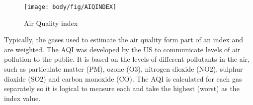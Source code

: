 \begin{figure}[!htb]
	\centering
	\texttt{[image: body/fig/AIQINDEX]}
	\caption{Air Quality index \cite{GreenEcon2}}
	\label{fig:index}
\end{figure}

\noindent
Typically, the gases used to estimate the air quality form part of an index and are weighted. The AQI was developed by the US to communicate levels of air pollution to the public\cite{Airly}.  It is based on the levels of different pollutants in the air, such as particulate matter (PM), ozone (O3), nitrogen dioxide (NO2), sulphur dioxide (SO2) and carbon monoxide (CO). The AQI is calculated for each gas separately so it is logical to measure each and take the highest (worst) as the index value\cite{worldairqualityranking}.









